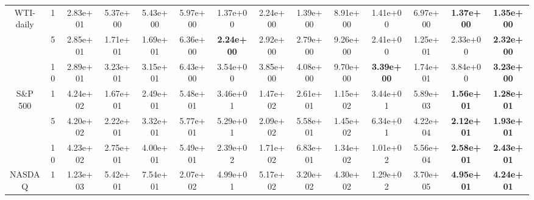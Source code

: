 \begin{table*}[!t]
{\begin{tabular}{cccccccccccccc}
            \multirowcell{3}{WTI-\\daily}   & 1                  & 2.83e+01                        & 5.37e+00                     & 5.43e+00                   & 5.97e+00                     & 1.37e+00          & 2.24e+00          & 1.39e+00 & 8.91e+00 & 1.41e+00          & 6.97e+00 & \textbf{1.37e+00} & \textbf{1.35e+00}\s \\ \cmidrule(l){3-14}
                                     & 5                  & 2.85e+01                        & 1.71e+01                     & 1.69e+01                   & 6.36e+00                     & \textbf{2.24e+00}\s & 2.92e+00          & 2.79e+00 & 9.26e+00 & 2.41e+00          & 1.25e+01 & 2.33e+00          & \textbf{2.32e+00} \\ \cmidrule(l){3-14}
                                     & 10                 & 2.89e+01                        & 3.23e+01                     & 3.15e+01                   & 6.43e+00                     & 3.54e+00          & 3.85e+00          & 4.08e+00 & 9.70e+00 & \textbf{3.39e+00} & 1.74e+01 & 3.84e+00          & \textbf{3.23e+00}\s \\ \cmidrule(l){2-14}
            \multirow{3}{*}{S\&P 500}      & 1                  & 4.24e+02                        & 1.67e+01                     & 2.49e+01                   & 5.48e+01                     & 3.46e+01          & 1.47e+02          & 2.61e+01 & 1.15e+02 & 3.44e+01          & 5.89e+03 & \textbf{1.56e+01} & \textbf{1.28e+01}\s \\ \cmidrule(l){3-14}
                                     & 5                  & 4.20e+02                        & 2.22e+01                     & 3.32e+01                   & 5.77e+01                     & 5.29e+01          & 2.09e+02          & 5.58e+01 & 1.45e+02 & 6.34e+01          & 4.22e+04 & \textbf{2.12e+01} & \textbf{1.93e+01}\s \\ \cmidrule(l){3-14}
                                     & 10                 & 4.23e+02                        & 2.75e+01                     & 4.00e+01                   & 5.49e+01                     & 2.39e+02          & 1.71e+02          & 6.83e+01 & 1.34e+02 & 1.01e+02          & 5.56e+04 & \textbf{2.58e+01} & \textbf{2.43e+01}\s \\ \cmidrule(l){2-14}
            \multirow{3}{*}{NASDAQ}  & 1                  & 1.23e+03                        & 5.42e+01                     & 7.54e+01                   & 2.07e+02                     & 4.99e+01          & 5.17e+02          & 3.20e+02 & 4.30e+02 & 1.29e+02          & 3.70e+05 & \textbf{4.95e+01} & \textbf{4.24e+01}\s \\ \cmidrule(l){3-14}

\end{tabular}}
\end{table*}
